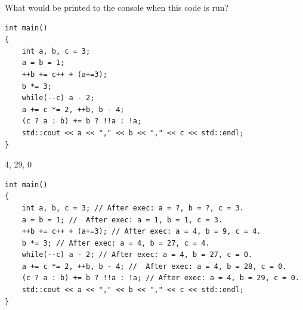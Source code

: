 \documentclass{exam}
\begin{document}
\begin{questions}
\question What would be printed to the console when this code is run?
\begin{lstlisting}
int main()
{
	int a, b, c = 3;
	a = b = 1;
	++b += c++ + (a+=3);
	b *= 3;
	while(--c) a - 2;
	a += c *= 2, ++b, b - 4;
	(c ? a : b) += b ? !!a : !a;
	std::cout << a << "," << b << "," << c << std::endl;
}
\end{lstlisting}
\begin{solution}[.2in]
4, 29, 0
\begin{lstlisting}
int main()
{
	int a, b, c = 3; // After exec: a = ?, b = ?, c = 3.
	a = b = 1; //  After exec: a = 1, b = 1, c = 3.
	++b += c++ + (a+=3); // After exec: a = 4, b = 9, c = 4.
	b *= 3; // After exec: a = 4, b = 27, c = 4.
	while(--c) a - 2; // After exec: a = 4, b = 27, c = 0.
	a += c *= 2, ++b, b - 4; //  After exec: a = 4, b = 28, c = 0.
	(c ? a : b) += b ? !!a : !a; // After exec: a = 4, b = 29, c = 0.
	std::cout << a << "," << b << "," << c << std::endl;
}
\end{lstlisting}
\end{solution}

\end{questions}

\newpage
\end{document}
